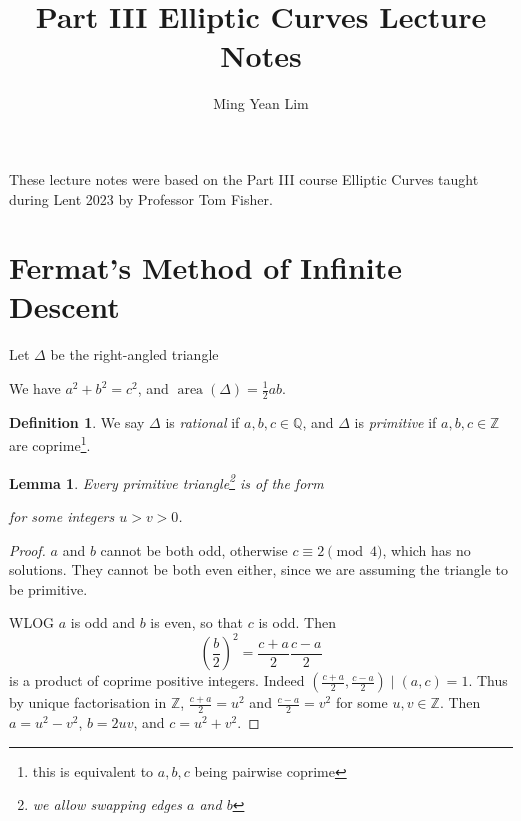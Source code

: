 \documentclass[11pt]{article}
\title{Part III Elliptic Curves Lecture Notes}
\author{Ming Yean Lim}
\theoremstyle{definition}
\newtheorem*{definition*}{Definition}
\theoremstyle{plain}
\newtheorem{lemma}[definition]{Lemma}
\theoremstyle{remark}
\DeclareMathOperator{\area}{area}
\newcommand{\ZZ}{\mathbb{Z}}
\newcommand{\QQ}{\mathbb{Q}}
\begin{document}
\maketitle

\noindent These lecture notes were based on the Part III course Elliptic Curves taught during Lent 2023 by Professor Tom Fisher.



\section{Fermat's Method of Infinite Descent}

Let $\Delta$ be the right-angled triangle
\begin{center}
\end{center}
We have $a^2 + b^2 = c^2$, and $\area(\Delta) = \frac{1}{2} a b$.

\begin{definition*}
    We say $\Delta$ is \emph{rational} if $a, b, c \in \QQ$, and $\Delta$ is \emph{primitive} if $a, b, c \in \ZZ$ are coprime\footnote{this is equivalent to $a, b, c$ being pairwise coprime}.
\end{definition*}

\begin{lemma}\label{lem:1_1}
    Every primitive triangle\footnote{we allow swapping edges $a$ and $b$} is of the form
    \begin{center}
    \end{center}
    for some integers $u > v > 0$.
\end{lemma}
\begin{proof}
    $a$ and $b$ cannot be both odd, otherwise $c \equiv 2 \pmod{4}$, which has no solutions. They cannot be both even either, since we are assuming the triangle to be primitive.

    WLOG $a$ is odd and $b$ is even, so that $c$ is odd. Then
    \begin{equation*}
        \left(\frac{b}{2}\right)^2 = \frac{c+a}{2} \frac{c-a}{2}
    \end{equation*}
    is a product of coprime positive integers. Indeed $(\frac{c+a}{2}, \frac{c-a}{2}) \mid (a, c) = 1$. Thus by unique factorisation in $\ZZ$, $\frac{c+a}{2} = u^2$ and $\frac{c-a}{2} = v^2$ for some $u, v \in \ZZ$. Then $a = u^2 - v^2$, $b = 2uv$, and $c = u^2 + v^2$.
\end{proof}
\end{document}
